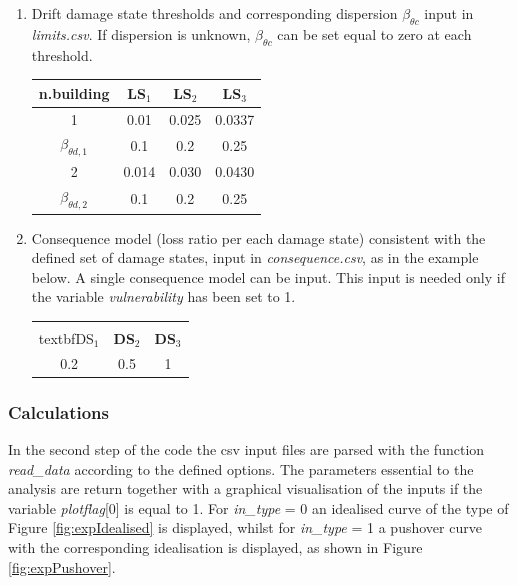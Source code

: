 \begin{enumerate}
\item Drift damage state thresholds and corresponding dispersion $\beta_{\theta c}$ input in \textit{limits.csv}. If dispersion is unknown, $\beta_{\theta c}$ can be set equal to zero at each threshold.
	\begin{table}[H]
	\centering
	\begin{tabular}{|c|c|c|c|} \hline
	\textbf{n.building} & \textbf{LS$_1$} &	\textbf{LS$_2$} &	\textbf{LS$_3$} \\ \hline
	1 & 0.01 &	0.025 & 0.0337\\ \hline
	$\beta_{\theta d, 1}$ &	0.1 & 0.2 & 0.25\\ \hline
	2 & 0.014 &	0.030 & 0.0430\\ \hline
	$\beta_{\theta d, 2}$ &	0.1 & 0.2 & 0.25\\ \hline
	\end{tabular}
	\end{table}

\item Consequence model (loss ratio per each damage state) consistent with the defined set of damage states, input in \textit{consequence.csv}, as in the example below. A single consequence model can be input. This input is needed only if the variable \textit{vulnerability} has been set to 1.
	\begin{table}[H]
	\centering
	\begin{tabular}{|c|c|c|} \hline
	\\textbf{DS$_1$} & \textbf{DS$_2$} & \textbf{DS$_3$} \\ \hline
	0.2	& 0.5	 & 1\\ \hline
	\end{tabular}
	\end{table}
	
\end{enumerate}
\subsubsection{Calculations}
In the second step of the code the csv input files are parsed with the function \textit{read\_data} according to the defined options. The parameters essential to the analysis are return together with a graphical visualisation of the inputs if the variable \textit{plotflag}[0] is equal to 1. For \textit{in\_type} = 0 an idealised curve of the type of Figure \ref{fig:expIdealised} is displayed, whilst for \textit{in\_type} = 1 a pushover curve with the corresponding idealisation is displayed, as shown in Figure \ref{fig:expPushover}. 

